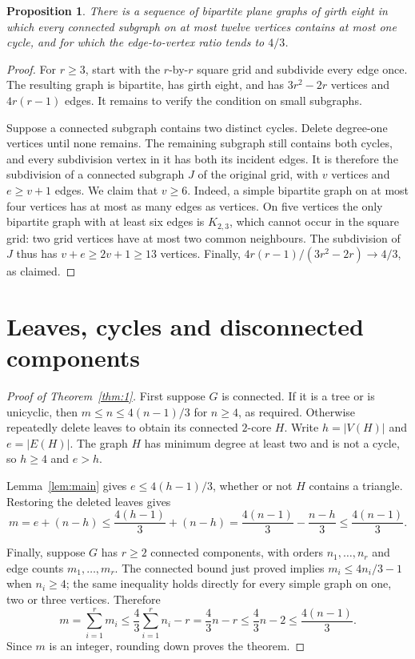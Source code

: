 \documentclass[11pt,a4paper]{article}
\newtheorem{proposition}[theorem]{Proposition}
\begin{document}
\begin{proposition}\label{prop:grid}
There is a sequence of bipartite plane graphs of girth eight in which
every connected subgraph on at most twelve vertices contains at most
one cycle, and for which the edge-to-vertex ratio tends to $4/3$.
\end{proposition}

\begin{proof}
For $r\ge3$, start with the $r$-by-$r$ square grid and subdivide every
edge once. The resulting graph is bipartite, has girth eight, and has
$3r^2-2r$ vertices and $4r(r-1)$ edges. It remains to verify the
condition on small subgraphs.

Suppose a connected subgraph contains two distinct cycles. Delete
degree-one vertices until none remains. The remaining subgraph still
contains both cycles, and every subdivision vertex in it has both its
incident edges. It is therefore the subdivision of a connected subgraph
$J$ of the original grid, with $v$ vertices and $e\ge v+1$ edges. We
claim that $v\ge6$. Indeed, a simple bipartite graph on at most four
vertices has at most as many edges as vertices. On five vertices the
only bipartite graph with at least six edges is $K_{2,3}$, which cannot
occur in the square grid: two grid vertices have at most two common
neighbours. The subdivision of $J$ thus has $v+e\ge2v+1\ge13$
vertices. Finally, $4r(r-1)/(3r^2-2r)\to4/3$, as claimed.
\end{proof}

\section{Leaves, cycles and disconnected components}\label{sec:reductions}

\begin{proof}[Proof of Theorem~\ref{thm:1}]
First suppose $G$ is connected. If it is a tree or is unicyclic, then
$m\le n\le4(n-1)/3$ for $n\ge4$, as required. Otherwise repeatedly
delete leaves to obtain its connected $2$-core $H$. Write
$h=|V(H)|$ and $e=|E(H)|$. The graph $H$ has minimum degree at least
two and is not a cycle, so $h\ge4$ and $e>h$.

Lemma~\ref{lem:main} gives $e\le4(h-1)/3$, whether or not $H$
contains a triangle. Restoring the deleted leaves gives
\[
 m=e+(n-h)\le\frac{4(h-1)}3+(n-h)
   =\frac{4(n-1)}3-\frac{n-h}3
   \le\frac{4(n-1)}3.
\]

Finally, suppose $G$ has $r\ge2$ connected components, with orders
$n_1,\ldots,n_r$ and edge counts $m_1,\ldots,m_r$. The connected bound
just proved implies $m_i\le4n_i/3-1$ when $n_i\ge4$; the same
inequality holds directly for every simple graph on one, two or three
vertices. Therefore
\[
 m=\sum_{i=1}^{r}m_i\le\frac43\sum_{i=1}^{r}n_i-r
   =\frac43n-r\le\frac43n-2\le\frac{4(n-1)}3.
\]
Since $m$ is an integer, rounding down proves the theorem.
\end{proof}
\end{document}
